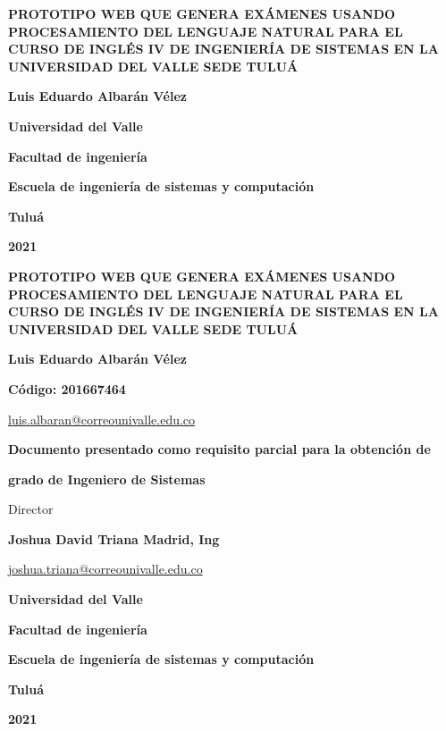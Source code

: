 \documentclass[../Main.tex]{subfiles}
\begin{document}
\thispagestyle{empty} %
\begin{center}

		{\bf PROTOTIPO WEB QUE GENERA EXÁMENES USANDO PROCESAMIENTO DEL LENGUAJE NATURAL PARA EL CURSO DE INGLÉS IV DE INGENIERÍA DE SISTEMAS EN LA UNIVERSIDAD DEL VALLE SEDE TULUÁ}
	    \vfill
		{\bf Luis Eduardo Albarán Vélez \par}
		\vfill
		{\bf Universidad del Valle  \par}
		{\bf Facultad de ingeniería \par}
		{\bf Escuela de ingeniería de sistemas y computación \par}
		{\bf Tuluá \par}
		{\bf 2021 \par}

\end{center}

\newpage
\thispagestyle{empty}
\begin{center}
	{\bf PROTOTIPO WEB QUE GENERA EXÁMENES USANDO PROCESAMIENTO DEL LENGUAJE NATURAL PARA EL CURSO DE INGLÉS IV DE INGENIERÍA DE SISTEMAS EN LA UNIVERSIDAD DEL VALLE SEDE TULUÁ}
		\vfill
		\vfill
		\vfill
		\vfill
		{\bf Luis Eduardo Albarán Vélez \par}
		{\bf Código: 201667464 \par}
		{\url{luis.albaran@correounivalle.edu.co} \par}
		\vfill
		\vfill
		\vfill
		\vfill
		{\bf Documento presentado como requisito parcial para la obtención de \par}
		{\bf grado de Ingeniero de Sistemas \par}
		\vfill
		\vfill
		\vfill
		\vfill
		{Director \par}
		{\bf Joshua David Triana Madrid, Ing \par}
		{\url{joshua.triana@correounivalle.edu.co} \par}
		\vfill
		\vfill
		\vfill
		\vfill
		{\bf Universidad del Valle  \par}
		{\bf Facultad de ingeniería \par}
		{\bf Escuela de ingeniería de sistemas y computación \par}
		{\bf Tuluá \par}
		{\bf 2021 \par}

\end{center}
\end{document}
